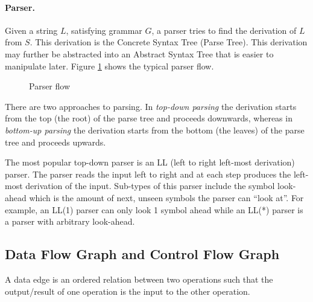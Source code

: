 \paragraph{Parser.}
Given a string $L$, satisfying grammar $G$, a parser tries to find the
derivation of $L$ from $S$. This derivation is the Concrete Syntax
Tree (Parse Tree). This derivation may further be abstracted into an
Abstract Syntax Tree that is easier to manipulate later. Figure
\ref{fig:parser_flow} shows the typical parser flow.

\begin{figure}[hbt!]
  \centering
  \caption{Parser flow}
  \label{fig:parser_flow}
\end{figure}

\noindent There are two approaches to parsing. In \emph{top-down parsing} the derivation starts from the top (the root) of the parse tree and proceeds downwards, whereas in \emph{bottom-up parsing} the derivation starts from the bottom (the leaves) of the parse tree and proceeds upwards.

The most popular top-down parser is an LL (left to right left-most
derivation) parser. The parser reads the input left to right and at
each step produces the left-most derivation of the input. Sub-types of
this parser include the symbol look-ahead which is the amount of next,
unseen symbols the parser can ``look at''. For example, an LL(1)
parser can only look 1 symbol ahead while an LL(*) parser is a parser
with arbitrary look-ahead.


\subsection{Data Flow Graph and Control Flow Graph}

\begin{defn}
  A data edge is an ordered relation between two operations such that
  the output/result of one operation is the input to the other
  operation.
\end{defn}

